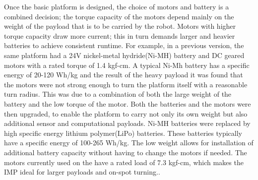 Once the basic platform is designed, the choice of motors and battery is a combined decision; the torque capacity of the motors depend mainly on the weight of the payload that is to be carried by the robot. Motors with higher torque capacity draw more current; this in turn demands larger and heavier batteries to achieve consistent runtime. For example, in a previous version, the same platform had a 24V nickel-metal hydride(Ni-MH) battery and DC geared motors with a rated torque of 1.4 kgf-cm. A typical Ni-Mh battery has a specific energy of 20-120 Wh/kg and the result of the heavy payload it was found that the motors were not strong enough to turn the platform itself with a reasonable turn radius. This was due to a combination of both the large weight of the battery and the low torque of the motor. 
Both the batteries and the motors were then upgraded, to enable the platform to carry not only its own weight but also additional sensor and computational payloads. Ni-MH batteries were replaced by high specific energy lithium polymer(LiPo) batteries. These batteries typically have a specific energy of 100-265 Wh/kg. The low weight allows for installation of additional battery capacity without having to change the motors if needed. The motors currently used on the \imp have a rated load of 7.3 kgf-cm, which makes the IMP ideal for larger payloads and on-spot turning..


%


